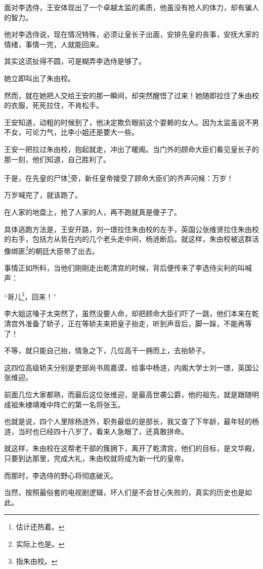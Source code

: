 \begin{multicols}{\theparacolNo}
		面对李选侍，王安体现出了一个卓越太监的素质，他虽没有抢人的体力，却有骗人的智力。

		他对李选侍说，现在情况特殊，必须让皇长子出面，安排先皇的丧事，安抚大家的情绪，事情一完，人就能回来。

		其实这谎扯得不圆，可是糊弄李选侍是够了。

		她立即叫出了朱由校。

		然而，就在她把人交给王安的那一瞬间，却突然醒悟了过来！她随即拉住了朱由校的衣服，死死拉住，不肯松手。

		王安知道，动粗的时候到了，他决定欺负眼前这个耍赖的女人。因为太监虽说不男不女，可论力气，比李小姐还是要大一些。

		王安一把拉过朱由校，抱起就走，冲出了暖阁。当门外的顾命大臣们看见皇长子的那一刻，他们知道，自己胜利了。

		于是，在先皇的尸体\footnote{估计还热着。}旁，新任皇帝接受了顾命大臣们的齐声问候：万岁！

		万岁喊完了，就该跑了。

		在人家的地盘上，抢了人家的人，再不跑就真是傻子了。

		具体逃跑方法是，王安开路，刘一璟拉住朱由校的左手，英国公张维贤拉住朱由校的右手，包括方从哲在内的几个老头走中间，杨涟断后。就这样，朱由校被这群活像绑匪\footnote{实际上也是。}的朝廷大臣带了出去。

		事情正如所料，当他们刚刚走出乾清宫的时候，背后便传来了李选侍尖利的叫喊声：

		“哥儿\footnote{指朱由校。}，回来！”

		李大姐这嗓子太突然了，虽然没要人命，却把顾命大臣们吓了一跳，他们本来在乾清宫外准备了轿子，正在等轿夫来把皇子抬走，听到声音后，脚一跺，不能再等了！

		不等，就只能自己抬，情急之下，几位高干一拥而上，去抬轿子。

		这四位高级轿夫分别是吏部尚书周嘉谟，给事中杨涟，内阁大学士刘一璟，英国公张维迎。

		前面几位大家都熟，而最后这位张维迎，是最高世袭公爵，他的祖先，就是跟随明成祖朱棣靖难中阵亡的第一名将张玉。

		也就是说，四个人里除杨涟外，职务最低的是部长，我又查了下年龄，最年轻的杨涟，当时也已经四十八岁了，看来人急眼了，还真敢拼命。

		就这样，朱由校在这帮老干部的簇拥下，离开了乾清宫，他们的目标，是文华殿，只要到达那里，完成大礼，朱由校就将成为新一代的皇帝。

		而那时，李选侍的野心将彻底破灭。

		当然，按照最俗套的电视剧逻辑，坏人们是不会甘心失败的，真实的历史也是如此。


\end{multicols}
